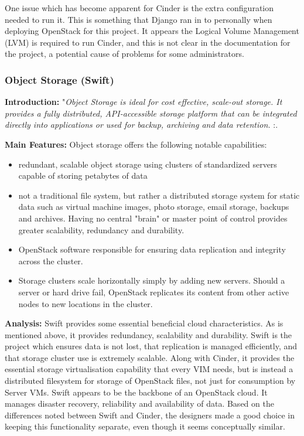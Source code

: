 One issue which has become apparent for Cinder is the extra configuration needed to run it. This is something that Django ran in to personally when deploying OpenStack for this project. It appears the Logical Volume Management (LVM) is required to run Cinder, and this is not clear in the documentation for the project, a potential cause of problems for some administrators.
 
\subsubsection{Object Storage (Swift)}
\textbf{Introduction:}
"\textit{Object Storage is ideal for cost effective, scale-out storage. It provides a fully distributed, API-accessible storage platform that can be integrated directly into applications or used for backup, archiving and data retention. }\cite{openstackstorage}:.

\textbf{Main Features:}
Object storage offers the following notable capabilities\cite{openstackstorage}:

\begin{itemize}
\itemsep0em
\item redundant, scalable object storage using clusters of standardized servers capable of storing petabytes of data
\item not a traditional file system, but rather a distributed storage system for static data such as virtual machine images, photo storage, email storage, backups and archives. Having no central "brain" or master point of control provides greater scalability, redundancy and durability.
\item OpenStack software responsible for ensuring data replication and integrity across the cluster.
\item Storage clusters scale horizontally simply by adding new servers. Should a server or hard drive fail, OpenStack replicates its content from other active nodes to new locations in the cluster. 
\end{itemize}

\textbf{Analysis: }
Swift provides some essential beneficial cloud characteristics. As is mentioned above, it provides redundancy, scalability and durability. Swift is the project which ensures data is not lost, that replication is managed efficiently, and that storage cluster use is extremely scalable. Along with Cinder, it provides the essential storage virtualisation capability that every VIM needs, but is instead a distributed filesystem for storage of OpenStack files, not just for consumption by Server VMs. Swift appears to be the backbone of an OpenStack cloud. It manages disaster recovery, reliability and availability of data. 
Based on the differences noted between Swift and Cinder, the designers made a good choice in keeping this functionality separate, even though it seems conceptually similar. 

